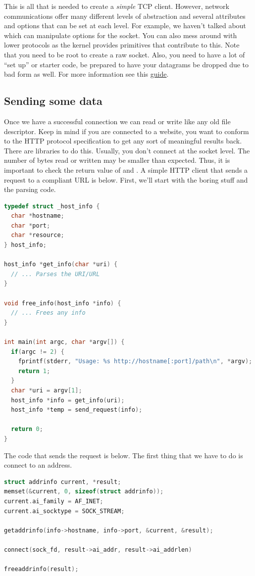 This is all that is needed to create a \textit{simple} TCP client.
However, network communications offer many different levels of abstraction and several attributes and options that can be set at each level.
For example, we haven't talked about  which can manipulate options for the socket.
You can also mess around with lower protocols as the kernel provides primitives that contribute to this.
Note that you need to be root to create a raw socket.
Also, you need to have a lot of ``set up'' or starter code, be prepared to have your datagrams be dropped due to bad form as well.
For more information see this \href{https://beej.us/guide/bgnet/html/split/man-pages.html#getaddrinfoman}{guide}.

\subsection{Sending some data}

Once we have a successful connection we can read or write like any old file descriptor.
Keep in mind if you are connected to a website, you want to conform to the HTTP protocol specification to get any sort of meaningful results back.
There are libraries to do this.
Usually, you don't connect at the socket level.
The number of bytes read or written may be smaller than expected.
Thus, it is important to check the return value of  and .
A simple HTTP client that sends a request to a compliant URL is below.
First, we'll start with the boring stuff and the parsing code.

\begin{lstlisting}[language=C]
typedef struct _host_info {
  char *hostname;
  char *port;
  char *resource;
} host_info;

host_info *get_info(char *uri) {
  // ... Parses the URI/URL
}

void free_info(host_info *info) {
  // ... Frees any info
}

int main(int argc, char *argv[]) {
  if(argc != 2) {
    fprintf(stderr, "Usage: %s http://hostname[:port]/path\n", *argv);
    return 1;
  }
  char *uri = argv[1];
  host_info *info = get_info(uri);
  host_info *temp = send_request(info);

  return 0;
}
\end{lstlisting}

The code that sends the request is below.
The first thing that we have to do is connect to an address.

\begin{lstlisting}[language=C]
struct addrinfo current, *result;
memset(&current, 0, sizeof(struct addrinfo));
current.ai_family = AF_INET;
current.ai_socktype = SOCK_STREAM;

getaddrinfo(info->hostname, info->port, &current, &result);

connect(sock_fd, result->ai_addr, result->ai_addrlen)

freeaddrinfo(result);
\end{lstlisting}

